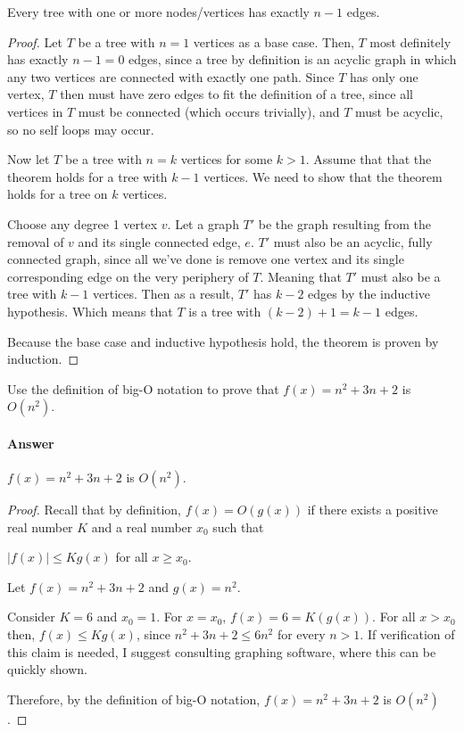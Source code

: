 \documentclass{article}
\begin{document}
\begin{theorem} Every tree with one or more nodes/vertices has
exactly $n-1$ edges.
\end{theorem}
\begin{proof}
	Let $T$ be a tree with $n=1$ vertices as a base case. Then, $T$ most definitely has exactly $n-1=0$ 
	edges, since a tree by definition is an acyclic graph in which any two vertices are connected with exactly one path.
	Since $T$ has only one vertex, $T$ then must have zero edges to fit the definition of a tree, since all 
	vertices in $T$ must be connected (which occurs trivially), and $T$ must be acyclic, so no self loops may occur.

	Now let $T$ be a tree with $n=k$ vertices for some $k>1$. Assume that that the theorem holds for a tree with $k-1$ vertices.
	We need to show that the theorem holds for a tree on $k$ vertices.

	Choose any degree 1 vertex $v$. Let a graph $T'$ be the graph resulting from the removal of $v$ and its single connected
	edge, $e$. $T'$ must also be an acyclic, fully connected graph, since all we've done is remove one vertex and its single
	corresponding edge on the very periphery of $T$. Meaning that $T'$ must also be a tree with $k-1$ vertices. Then as a 
	result, $T'$ has $k-2$ edges by the inductive hypothesis. Which means that $T$ is a tree with $(k-2) + 1 = k - 1$ edges. 
	
	Because the base case and inductive hypothesis hold, the theorem is proven by induction.


\end{proof}




\nextprob
Use the definition of big-O notation to prove that $f(x)=n^2 + 3n +2$ is
$O(n^2)$.

\paragraph{Answer}


\begin{theorem}
	$f(x)=n^2 + 3n +2$ is $O(n^2)$.
\end{theorem}
\begin{proof}
	Recall that by definition, $f(x) = O(g(x))$ if there exists a positive real number $K$ and a real number $x_0$
	such that

	$|f(x)|\leq K g(x)$ for all $x \geq x_0$.

	Let $f(x)=n^2 + 3n + 2$ and $g(x) = n^2$.

	Consider $K=6$ and $x_0=1$. For $x=x_0$, $f(x)=6=K(g(x))$. For all $x > x_0$ then, $f(x) \leq K g(x)$, 
	since $n^2 + 3n + 2 \leq 6n^2$ for every $n>1$. If verification of this claim is needed, I suggest
	consulting graphing software, where this can be quickly shown.

	Therefore, by the definition of big-O notation, $f(x)=n^2 + 3n + 2$ is $O(n^2)$.

\end{proof}
\end{document}
